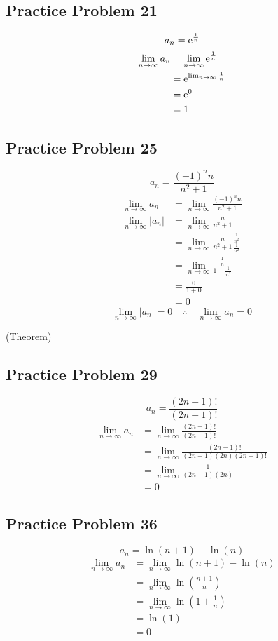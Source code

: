 \documentclass[letterpaper, 12pt]{math}
\begin{document}
\subsection*{Practice Problem 21}
\[ a_{n} = \mathrm{e}^{\frac{1}{n}} \]
\begin{align*}
  \lim_{n\to\infty}{a_{n}} &= \lim_{n\to\infty}{\mathrm{e}^{\frac{1}{n}}} \\
  &= \mathrm{e}^{\lim_{n\to\infty}{\frac{1}{n}}} \\
  &= \mathrm{e}^{0} \\
  &= 1
\end{align*}

\subsection*{Practice Problem 25}
\[ a_{n} = \frac{(-1)^{n}n}{n^{2}+1} \]
\begin{align*}
  \lim_{n\to\infty}{a_{n}} &= \lim_{n\to\infty}{\frac{(-1)^{n}n}{n^{2}+1}} \\
  \lim_{n\to\infty}{|a_{n}|} &= \lim_{n\to\infty}{\frac{n}{n^{2}+1}} \\
  &= \lim_{n\to\infty}
    {\frac{n}{n^{2}+1}\frac{\frac{1}{n^{2}}}{\frac{1}{n^{2}}}} \\
  &= \lim_{n\to\infty}
    {\frac{\frac{1}{n}}{1+\frac{1}{n^{2}}}} \\
  &= \frac{0}{1+0} \\
  &= 0
\end{align*}
\[ \lim_{n\to\infty}{|a_{n}|} = 0 \quad \therefore \quad
   \lim_{n\to\infty}{a_{n}} = 0 \]
\begin{center}
  (Theorem)
\end{center}

\subsection*{Practice Problem 29}
\[ a_{n} = \frac{(2n-1)!}{(2n+1)!} \]
\begin{align*}
  \lim_{n\to\infty}{a_{n}} &= \lim_{n\to\infty}{\frac{(2n-1)!}{(2n+1)!}} \\
  &= \lim_{n\to\infty}{\frac{(2n-1)!}{(2n+1)(2n)(2n-1)!}} \\
  &= \lim_{n\to\infty}{\frac{1}{(2n+1)(2n)}} \\
  &= 0
\end{align*}

\subsection*{Practice Problem 36}
\[ a_{n} = \ln(n+1)-\ln(n) \]
\begin{align*}
  \lim_{n\to\infty}{a_{n}} &= \lim_{n\to\infty}{\ln(n+1)-\ln(n)} \\
  &= \lim_{n\to\infty}{\ln(\frac{n+1}{n})} \\
  &= \lim_{n\to\infty}{\ln(1+\frac{1}{n})} \\
  &= \ln(1) \\
  &= 0
\end{align*}
\end{document}
